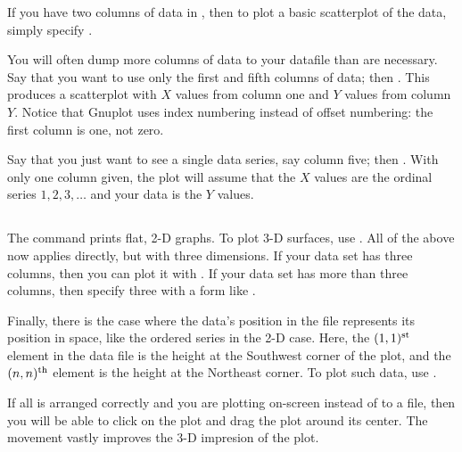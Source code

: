 If you have two columns of data in , then to plot a basic
scatterplot of the data, simply specify . 

You will often dump more columns of data to your datafile than are
necessary. Say that you want to use only the first and fifth columns of
data; then . This produces a scatterplot
with $X$ values from column one and $Y$ values from column $Y$.
Notice that Gnuplot uses index numbering instead of offset numbering:
the first column is one, not zero.

Say that you just want to see a single data series, say column five; then 
. With only one column given, the plot will
assume that the $X$ values are the ordinal series $1, 2, 3, \dots$ and
your data is the $Y$ values.

\subsection{} The  command prints flat, 2-D graphs.
To plot 3-D surfaces, use . All of the above now applies
directly, but with three dimensions. If your data set has three columns, then
you can plot it with . If your data set has more
than three columns, then specify three with a form like . 

Finally, there is the case where the data's  position in the file
represents its position in space, like the ordered series in the 2-D
case. Here, the $(1,1)^{\rm st}$ element in the data file is the
height at the Southwest corner of the plot, and the $(n,n)^{\rm th}$
element is the height at the Northeast corner. To plot such data, use
.

If all is arranged correctly and you are plotting on-screen instead of
to a file, then you will be able to click on the plot and drag the plot
around its center. The movement vastly improves the 3-D impresion of the plot.

